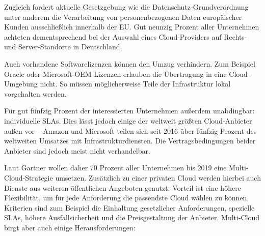 Zugleich fordert aktuelle Gesetzgebung wie die Datenschutz-Grundverordnung unter anderem die Verarbeitung von personenbezogenen Daten europäischer Kunden ausschließlich innerhalb der EU. %
Gut neunzig Prozent aller Unternehmen achteten dementsprechend bei der Auswahl eines Cloud-Providers auf Rechts- und Server-Standorte in Deutschland. 

Auch vorhandene Softwarelizenzen können den Umzug verhindern. Zum Beispiel Oracle oder Microsoft-OEM-Lizenzen erlauben die Übertragung in eine Cloud-Umgebung nicht. So müssen möglicherweise Teile der Infrastruktur lokal vorgehalten werden.



Für gut fünfzig Prozent der interessierten Unternehmen außerdem unabdingbar: individuelle SLAs.
Dies lässt jedoch einige der weltweit größten Cloud-Anbieter außen vor -- Amazon und Microsoft teilen sich seit 2016 über fünfzig Prozent des weltweiten Umsatzes mit Infrastrukturdiensten. Die Vertragsbedingungen beider Anbieter sind jedoch meist nicht verhandelbar. %

Laut Gartner wollen daher 70 Prozent aller Unternehmen bis 2019 eine Multi-Cloud-Strategie umsetzen. Zusätzlich zu einer privaten Cloud werden hierbei auch Dienste aus weiteren öffentlichen Angeboten genutzt. Vorteil ist eine höhere Flexibilität, um für jede Anforderung die passendste Cloud wählen zu können. Kriterien sind zum Beispiel die Einhaltung gesetzlicher Anforderungen, spezielle SLAs, höhere Ausfallsicherheit und die Preisgestaltung der Anbieter. Multi-Cloud birgt aber auch einige Herausforderungen:



%
%
%
%
%

